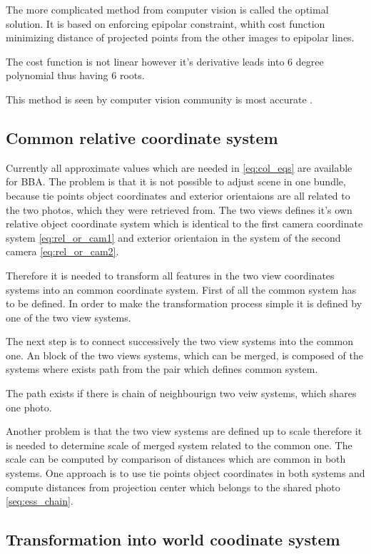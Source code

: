 \documentclass[a4paper,12pt]{report}
\begin{document}
The more complicated method from computer vision is called the optimal solution. 
It is based on enforcing epipolar constraint, whith cost function 
minimizing distance of projected points from the other images to epipolar lines.

The cost function is not linear however it's derivative leads into 6 degree polynomial thus 
having 6 roots.

This method is seen by computer vision community is most accurate \cite[p. 315]{Hartley2004}.  


\subsection{Common relative coordinate system}

Currently all approximate values which are needed in \eqref{eq:col_eqs} are available for BBA. 
The problem is that it is not possible to adjust scene in one bundle, because tie points
object coordinates and exterior orientaions are all related to the two photos, which they were 
retrieved from. The two views defines it's own relative object coordinate system which is identical
to the first camera coordinate system \eqref{eq:rel_or_cam1} and
exterior orientaion in the system of the second camera \eqref{eq:rel_or_cam2}.


Therefore it is needed to transform all features in the two view coordinates systems into 
an common coordinate system. First of all the common system has to be defined.
In order to make the transformation process simple it is defined by one of the two view
systems.

The next step is to connect successively the two view systems into the common one.  
An block of the two views systems, which can be merged, is composed of the systems 
where exists path from the pair which defines common system.

The path exists if there is chain of neighbourign two veiw systems, which 
shares one photo. 

Another problem is that the two view systems are defined up to scale therefore 
it is needed to determine scale of merged system related to the common one. 
The scale can be computed by comparison of distances which are common in both systems.
One approach is to use tie points object coordinates in both systems 
and compute distances from projection center which belongs to the shared photo \ref{seq:ess_chain}. 


\subsection{Transformation into world coodinate system}
\end{document}
